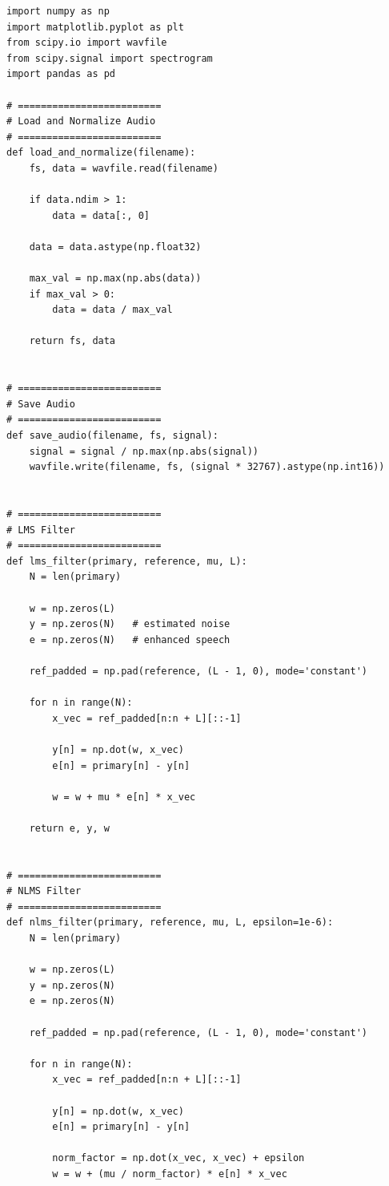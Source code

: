 \documentclass[12pt]{article}
\begin{document}
\begin{lstlisting}[caption={Python implementation of LMS and NLMS adaptive noise cancellation}, label={code:anc_lms_nlms}]
import numpy as np
import matplotlib.pyplot as plt
from scipy.io import wavfile
from scipy.signal import spectrogram
import pandas as pd

# =========================
# Load and Normalize Audio
# =========================
def load_and_normalize(filename):
    fs, data = wavfile.read(filename)

    if data.ndim > 1:
        data = data[:, 0]

    data = data.astype(np.float32)

    max_val = np.max(np.abs(data))
    if max_val > 0:
        data = data / max_val

    return fs, data


# =========================
# Save Audio
# =========================
def save_audio(filename, fs, signal):
    signal = signal / np.max(np.abs(signal))
    wavfile.write(filename, fs, (signal * 32767).astype(np.int16))


# =========================
# LMS Filter
# =========================
def lms_filter(primary, reference, mu, L):
    N = len(primary)

    w = np.zeros(L)
    y = np.zeros(N)   # estimated noise
    e = np.zeros(N)   # enhanced speech

    ref_padded = np.pad(reference, (L - 1, 0), mode='constant')

    for n in range(N):
        x_vec = ref_padded[n:n + L][::-1]

        y[n] = np.dot(w, x_vec)
        e[n] = primary[n] - y[n]

        w = w + mu * e[n] * x_vec

    return e, y, w


# =========================
# NLMS Filter
# =========================
def nlms_filter(primary, reference, mu, L, epsilon=1e-6):
    N = len(primary)

    w = np.zeros(L)
    y = np.zeros(N)
    e = np.zeros(N)

    ref_padded = np.pad(reference, (L - 1, 0), mode='constant')

    for n in range(N):
        x_vec = ref_padded[n:n + L][::-1]

        y[n] = np.dot(w, x_vec)
        e[n] = primary[n] - y[n]

        norm_factor = np.dot(x_vec, x_vec) + epsilon
        w = w + (mu / norm_factor) * e[n] * x_vec


\end{lstlisting}
\end{document}
